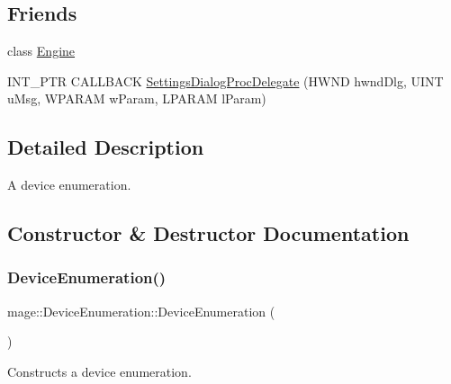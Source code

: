 \subsection*{Friends}
\begin{DoxyCompactItemize}
\item 
class \hyperlink{classmage_1_1_device_enumeration_a3e1914489e4bed4f9f23cdeab34a43dc}{Engine}
\item 
I\+N\+T\+\_\+\+P\+TR C\+A\+L\+L\+B\+A\+CK \hyperlink{classmage_1_1_device_enumeration_a3dff4eb8907e2e10f26cc616fe1c104d}{Settings\+Dialog\+Proc\+Delegate} (H\+W\+ND hwnd\+Dlg, U\+I\+NT u\+Msg, W\+P\+A\+R\+AM w\+Param, L\+P\+A\+R\+AM l\+Param)
\end{DoxyCompactItemize}


\subsection{Detailed Description}
A device enumeration. 

\subsection{Constructor \& Destructor Documentation}
\hypertarget{classmage_1_1_device_enumeration_aa000048648beb6c2aca70e5ef04e0da2}{}\label{classmage_1_1_device_enumeration_aa000048648beb6c2aca70e5ef04e0da2} 
\subsubsection{\texorpdfstring{Device\+Enumeration()}{DeviceEnumeration()}}
{\footnotesize\ttfamily mage\+::\+Device\+Enumeration\+::\+Device\+Enumeration (\begin{DoxyParamCaption}{ }\end{DoxyParamCaption})\hspace{0.3cm}{\ttfamily [protected]}}

Constructs a device enumeration. \hypertarget{classmage_1_1_device_enumeration_a5124c80acce55a3d539665423f3872dc}{}\label{classmage_1_1_device_enumeration_a5124c80acce55a3d539665423f3872dc} 
